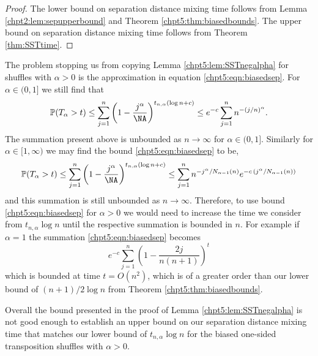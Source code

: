 \documentclass[11pt]{report}
\begin{document}
\begin{proof}
	The lower bound on separation distance mixing time follows from Lemma \ref{chpt2:lem:sepupperbound} and Theorem \ref{chpt5:thm:biasedbounds}. The upper bound on separation distance mixing time follows from  Theorem 
	\ref{thm:SSTtime}.
\end{proof}


The problem stopping us from copying Lemma 
\ref{chpt5:lem:SSTnegalpha} for shuffles with $\alpha>0$ is the approximation in equation \eqref{chpt5:eqn:biasedsep}.
For $\alpha \in (0,1]$ we still find that
\[ 	\mathbb{P}(T_{\alpha} > t) \leq \sum_{j=1}^{n}\left( 1 - \frac{j^{\alpha}}{\NA} \right)^{t_{n,\alpha}(\log n +c)} \leq e^{-c} \sum_{j=1}^{n} n^{-(j/n)^{\alpha}}. \]
The summation present above is unbounded as $n\to\infty$ for $\alpha \in (0,1]$. Similarly for $\alpha \in [1,\infty)$ we may find the bound \eqref{chpt5:eqn:biasedsep} to be,
\[	\mathbb{P}(T_{\alpha} > t) \leq \sum_{j=1}^{n}\left( 1 - \frac{j^{\alpha}}{\NA} \right)^{t_{n,\alpha}(\log n +c)} \leq \sum_{j=1}^{n}n^{-j^{\alpha}/N_{\alpha-1}(n)} e^{-c \,(j^{\alpha}/N_{\alpha-1}(n))}\]
and this summation is still unbounded as $n\to\infty$. Therefore, to use bound \eqref{chpt5:eqn:biasedsep} for $\alpha >0$ we would need to increase the time we consider from $t_{n,\alpha}\log n$ until the respective summation is bounded in $n$.  For example if $\alpha =1$ the summation  \eqref{chpt5:eqn:biasedsep} becomes
\[e^{-c}\sum_{j=1}^{n}\left( 1 - \frac{2j}{n(n+1)} \right)^{t} \]
which is bounded at time $t = O(n^{2})$, which is of a greater order than our lower bound of $(n+1)/2\log n$ from Theorem \ref{chpt5:thm:biasedbounds}.


Overall the bound presented in the proof of Lemma \ref{chpt5:lem:SSTnegalpha} is not good enough to establish an upper bound on our separation distance mixing time that matches our lower bound of $t_{n,\alpha} \log n$ for the biased one-sided transposition shuffles with $\alpha>0$.
\end{document}
